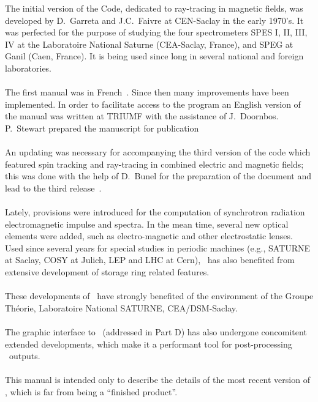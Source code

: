 \noindent The initial  version of the Code, dedicated to  ray-tracing in magnetic fields,
 was developed  by D.~Garreta and J.C.~Faivre  at CEN-Saclay in the early 1970's.
 It was perfected for the purpose of studying the four spectrometers SPES I, II, III, IV  
at the  Laboratoire National Saturne (CEA-Saclay, France), and SPEG at Ganil 
(Caen, France). It is being used since long in several national and foreign laboratories.
\\
\\
\noindent The first manual was in French~\cite{Biblio1}. %
 Since then many improvements have been implemented.  In order to facilitate access to 
the program an English version of the manual was written at TRIUMF with the assistance of 
J.~Doornbos. P.~Stewart prepared the manuscript for publication~\cite{Biblio2}%
\\
\\
\noindent  An updating was necessary for accompanying the third version of the code which featured 
 spin tracking and ray-tracing in combined electric and magnetic fields; 
 this was done with the help of 
D.~Bunel for the preparation of the document and lead to the third 
release~\cite{Biblio2b}.
\\
\\
\noindent Lately, provisions were introduced for the computation of 
synchrotron radiation electromagnetic impulse and spectra. In the mean 
time, several new optical elements were added, such as 
electro-magnetic and other electrostatic lenses. Used since several years for special studies in periodic
machines (e.g., SATURNE at Saclay, COSY at Julich, LEP and LHC at Cern),  
\zgou\  has also benefited from extensive development of storage ring related features.
\\
\\
\noindent These  developments of \zgou\ 
 have strongly benefited of the environment of the Groupe Th\'eorie, 
Laboratoire National SATURNE, CEA/DSM-Saclay. 
\\
\\
The graphic  interface to \zgou\ (addressed in Part D) has also undergone concomitent extended 
developments, which make it a performant tool for post-processing \zgou\  outputs.
\\
\\
\noindent  This manual is intended only to describe the details of the most
recent version of \zgou, which is far from being a ``finished product''.

\newpage

